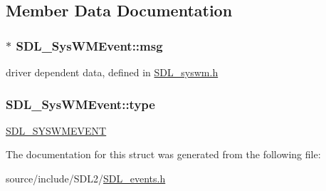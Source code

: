 \subsection{Member Data Documentation}
\hypertarget{struct_s_d_l___sys_w_m_event_ad5e3dc68aa15582cd0641847d41c74e8}{}
\subsubsection[{msg}]{$\ast$ S\+D\+L\+\_\+\+Sys\+W\+M\+Event\+::msg}\label{struct_s_d_l___sys_w_m_event_ad5e3dc68aa15582cd0641847d41c74e8}
driver dependent data, defined in \hyperlink{_s_d_l__syswm_8h}{S\+D\+L\+\_\+syswm.\+h} \hypertarget{struct_s_d_l___sys_w_m_event_a84697e96cb16bf6a570e10b5bfdcd392}{}
\subsubsection[{type}]{ S\+D\+L\+\_\+\+Sys\+W\+M\+Event\+::type}\label{struct_s_d_l___sys_w_m_event_a84697e96cb16bf6a570e10b5bfdcd392}
\hyperlink{_s_d_l__events_8h_a3b589e89be6b35c02e0dd34a55f3fccaa73749d735a18ce6ef17a09ee70d5dbe7}{S\+D\+L\+\_\+\+S\+Y\+S\+W\+M\+E\+V\+E\+N\+T} 

The documentation for this struct was generated from the following file\+:\begin{DoxyCompactItemize}
\item 
source/include/\+S\+D\+L2/\hyperlink{_s_d_l__events_8h}{S\+D\+L\+\_\+events.\+h}\end{DoxyCompactItemize}
